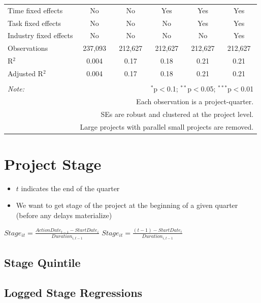 \documentclass[
]{article}
\providecommand{\tightlist}{%
  \setlength{\itemsep}{0pt}\setlength{\parskip}{0pt}}
\begin{document}
\begin{table}[H]
\begin{tabular}{@{\extracolsep{-2pt}}lccccc}
Time fixed effects & No & No & Yes & Yes & Yes \\ 
Task fixed effects & No & No & No & Yes & Yes \\ 
Industry fixed effects & No & No & No & No & Yes \\ 
Observations & 237,093 & 212,627 & 212,627 & 212,627 & 212,627 \\ 
R$^{2}$ & 0.004 & 0.17 & 0.18 & 0.21 & 0.21 \\ 
Adjusted R$^{2}$ & 0.004 & 0.17 & 0.18 & 0.21 & 0.21 \\ 
\hline 
\hline \\[-1.8ex] 
\textit{Note:}  & \multicolumn{5}{r}{$^{*}$p$<$0.1; $^{**}$p$<$0.05; $^{***}$p$<$0.01} \\ 
 & \multicolumn{5}{r}{Each observation is a project-quarter.} \\ 
 & \multicolumn{5}{r}{SEs are robust and clustered at the project level.} \\ 
 & \multicolumn{5}{r}{Large projects with parallel small projects are removed.} \\ 
\end{tabular} 
\end{table}

\hypertarget{project-stage}{%
\section{Project Stage}\label{project-stage}}

\begin{itemize}
\tightlist
\item
  \(t\) indicates the end of the quarter
\item
  We want to get stage of the project at the beginning of a given
  quarter (before any delays materialize)
\end{itemize}

\(Stage_{it}=\frac{ActionDate_{t-1}-StartDate_i}{Duration_{i,t-1}}\)
\(Stage_{it}=\frac{(t-1)-StartDate_i}{Duration_{i,t-1}}\)

\hypertarget{stage-quintile}{%
\subsection{Stage Quintile}\label{stage-quintile}}

\hypertarget{logged-stage-regressions}{%
\subsection{Logged Stage Regressions}\label{logged-stage-regressions}}
\end{document}

